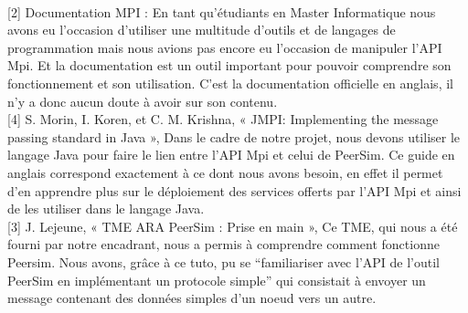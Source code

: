 \documentclass{article}
\begin{document}
		\\[2mm]
		[2] Documentation MPI : En tant qu’étudiants en Master Informatique nous avons eu l’occasion d’utiliser une multitude d’outils et de langages de programmation mais nous avions pas encore eu l’occasion de manipuler l’API Mpi. Et la documentation est un outil important pour pouvoir comprendre son fonctionnement et son utilisation. C’est la documentation officielle en anglais, il n’y a donc aucun doute à avoir sur son contenu.
		\\[2mm]
		[4] S. Morin, I. Koren, et C. M. Krishna, « JMPI: Implementing the message passing standard in Java », Dans le cadre de notre projet, nous devons utiliser le langage Java pour faire le lien entre l’API Mpi et celui de PeerSim. Ce guide en anglais correspond exactement à ce dont nous avons besoin, en effet il permet d’en apprendre plus sur le déploiement des services offerts par l’API Mpi et ainsi de les utiliser dans le langage Java.
		\\[2mm]
		 [3] J. Lejeune, « TME ARA PeerSim : Prise en main »,  Ce TME, qui nous a été fourni par notre encadrant, nous a permis à comprendre comment fonctionne Peersim. Nous avons, grâce à ce tuto, pu se “familiariser avec l’API de l’outil PeerSim en implémentant un protocole simple” qui consistait à envoyer un message contenant des données simples d’un noeud vers un autre.
\end{document}
